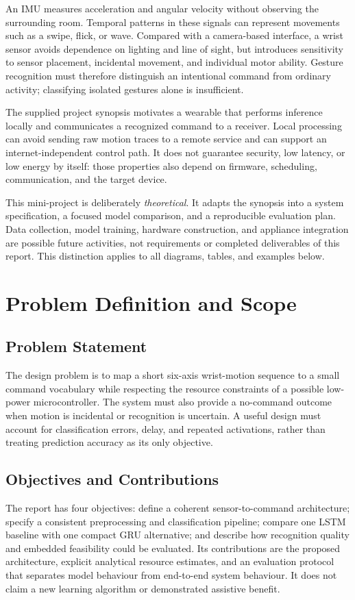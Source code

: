 \documentclass[conference]{IEEEtran}
\begin{document}
An IMU measures acceleration and angular velocity without observing the surrounding room. Temporal patterns in these signals can represent movements such as a swipe, flick, or wave. Compared with a camera-based interface, a wrist sensor avoids dependence on lighting and line of sight, but introduces sensitivity to sensor placement, incidental movement, and individual motor ability. Gesture recognition must therefore distinguish an intentional command from ordinary activity; classifying isolated gestures alone is insufficient.

The supplied project synopsis motivates a wearable that performs inference locally and communicates a recognized command to a receiver. Local processing can avoid sending raw motion traces to a remote service and can support an internet-independent control path. It does not guarantee security, low latency, or low energy by itself: those properties also depend on firmware, scheduling, communication, and the target device.

This mini-project is deliberately \emph{theoretical}. It adapts the synopsis into a system specification, a focused model comparison, and a reproducible evaluation plan. Data collection, model training, hardware construction, and appliance integration are possible future activities, not requirements or completed deliverables of this report. This distinction applies to all diagrams, tables, and examples below.

\section{Problem Definition and Scope}
\subsection{Problem Statement}
The design problem is to map a short six-axis wrist-motion sequence to a small command vocabulary while respecting the resource constraints of a possible low-power microcontroller. The system must also provide a no-command outcome when motion is incidental or recognition is uncertain. A useful design must account for classification errors, delay, and repeated activations, rather than treating prediction accuracy as its only objective.

\subsection{Objectives and Contributions}
The report has four objectives: define a coherent sensor-to-command architecture; specify a consistent preprocessing and classification pipeline; compare one LSTM baseline with one compact GRU alternative; and describe how recognition quality and embedded feasibility could be evaluated. Its contributions are the proposed architecture, explicit analytical resource estimates, and an evaluation protocol that separates model behaviour from end-to-end system behaviour. It does not claim a new learning algorithm or demonstrated assistive benefit.
\end{document}
